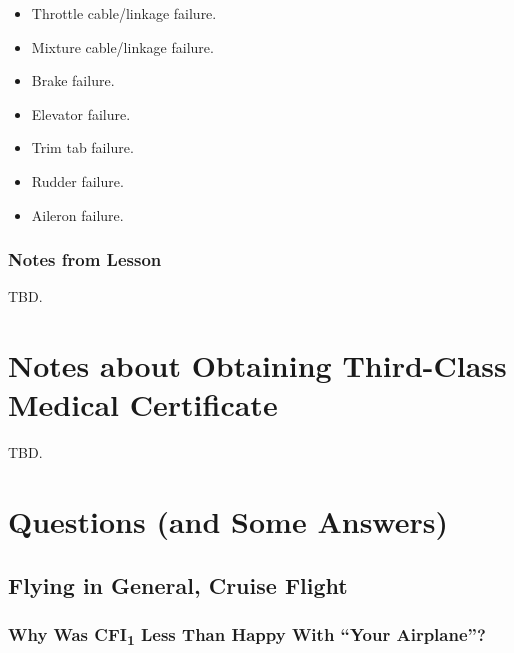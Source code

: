 \documentclass[letterpaper,10pt,titlepage]{article}
\begin{document}
\begin{itemize}
\item Throttle cable/linkage failure.
\item Mixture cable/linkage failure.
\item Brake failure.
\item Elevator failure.
\item Trim tab failure.
\item Rudder failure.
\item Aileron failure.
\end{itemize}


\subsubsection{Notes from Lesson}
\label{sfle0:scfa0:snff0}

TBD.


\section{Notes about Obtaining Third-Class Medical Certificate}
\label{stcm0}

TBD.


\section{Questions (and Some Answers)}
\label{sqsa0}



\subsection{Flying in General, Cruise Flight}
\label{sqsa0:sfig0}


\subsubsection{Why Was CFI\textsubscript{1} Less Than Happy With ``Your Airplane''?}
\label{sqsa0:sfig0:slhy0}
\end{document}
